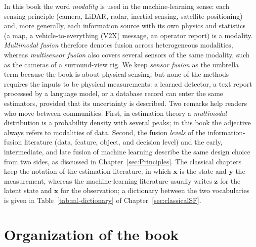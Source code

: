 In this book the word \emph{modality} is used in the machine-learning sense: each sensing principle (camera, LiDAR, radar, inertial sensing, satellite positioning) and, more generally, each information source with its own physics and statistics (a map, a vehicle-to-everything (V2X) message, an operator report) is a modality. \emph{Multimodal fusion} therefore denotes fusion across heterogeneous modalities, whereas \emph{multisensor fusion} also covers several sensors of the same modality, such as the cameras of a surround-view rig. We keep \emph{sensor fusion} as the umbrella term because the book is about physical sensing, but none of the methods requires the inputs to be physical measurements: a learned detector, a text report processed by a language model, or a database record can enter the same estimators, provided that its uncertainty is described. Two remarks help readers who move between communities. First, in estimation theory a \emph{multimodal} distribution is a probability density with several peaks; in this book the adjective always refers to modalities of data. Second, the fusion \emph{levels} of the information-fusion literature (data, feature, object, and decision level) and the early, intermediate, and late fusion of machine learning describe the same design choice from two sides, as discussed in Chapter~\ref{sec:Principles}. The classical chapters keep the notation of the estimation literature, in which $\mathbf{x}$ is the state and $\mathbf{y}$ the measurement, whereas the machine-learning literature usually writes $\mathbf{z}$ for the latent state and $\mathbf{x}$ for the observation; a dictionary between the two vocabularies is given in Table~\ref{tab:ml-dictionary} of Chapter~\ref{sec:classicalSF}.

\section{Organization of the book}

